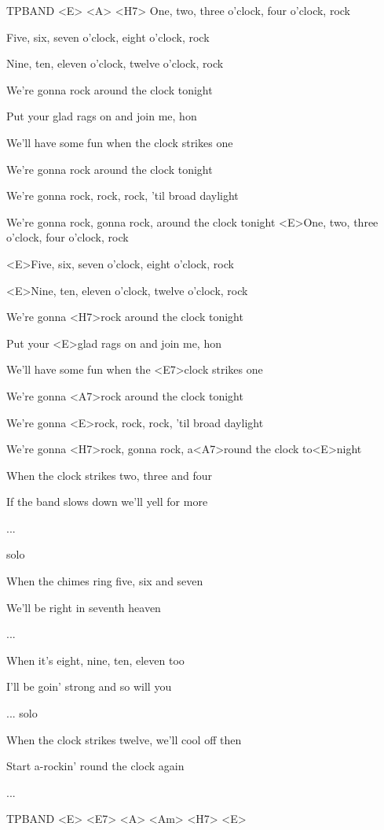 

\ifdefined TPBAND
<E> <A> <H7>
\zs 
One, two, three o'clock, four o'clock, rock

Five, six, seven o'clock, eight o'clock, rock

Nine, ten, eleven o'clock, twelve o'clock, rock

We're gonna rock around the clock tonight
\ks

\zs

Put your glad rags on and join me, hon

We'll have some fun when the clock strikes one

We're gonna rock around the clock tonight

We're gonna rock, rock, rock, 'til broad daylight

We're gonna rock, gonna rock, around the clock tonight
\ks
\else
\zs 
<E>One, two, three o'clock, four o'clock, rock

<E>Five, six, seven o'clock, eight o'clock, rock

<E>Nine, ten, eleven o'clock, twelve o'clock, rock

We're gonna <H7>rock around the clock tonight
\ks

\zs

Put your <E>glad rags on and join me, hon

We'll have some fun when the <E7>clock strikes one

We're gonna <A7>rock around the clock tonight

We're gonna <E>rock, rock, rock, 'til broad daylight

We're gonna <H7>rock, gonna rock, a<A7>round the clock to<E>night
\ks
\fi

\zs
When the clock strikes two, three and four

If the band slows down we'll yell for more

...
\ks

\zs
solo
\ks

\zs
When the chimes ring five, six and seven

We'll be right in seventh heaven

...
\ks

\zs
When it's eight, nine, ten, eleven too

I'll be goin' strong and so will you

...
\ks
\zs
solo
\ks

\zs
When the clock strikes twelve, we'll cool off then

Start a-rockin' round the clock again

...
\ks

\ifdefined TPBAND
<E> <E7> <A> <Am> <H7> <E>
\fi
\kp

